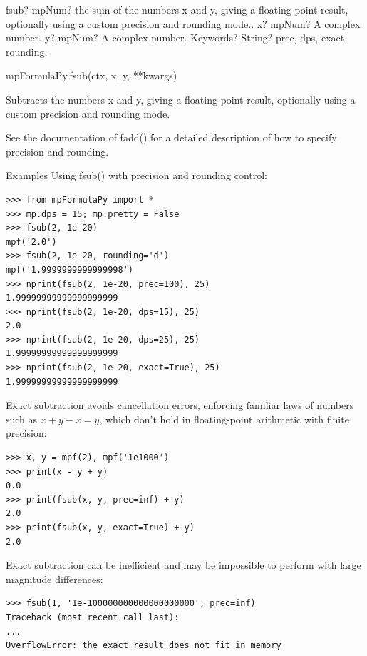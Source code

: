 \vspace{0.3cm}
\begin{mpFunctionsExtract}
	\mpFunctionThree
	{fsub? mpNum? the sum of the numbers x and y, giving a floating-point result, optionally using a custom precision and rounding mode..}
	{x? mpNum? A complex number.}
	{y? mpNum? A complex number.}
	{Keywords? String? prec, dps, exact, rounding.}	
\end{mpFunctionsExtract}

\vspace{0.3cm}
mpFormulaPy.fsub(ctx, x, y, **kwargs)

\vpara
Subtracts the numbers x and y, giving a floating-point result, optionally using a custom precision and rounding mode.

\vpara
See the documentation of fadd() for a detailed description of how to specify precision and rounding.

\vpara
Examples
Using fsub() with precision and rounding control:

\begin{lstlisting}
>>> from mpFormulaPy import *
>>> mp.dps = 15; mp.pretty = False
>>> fsub(2, 1e-20)
mpf('2.0')
>>> fsub(2, 1e-20, rounding='d')
mpf('1.9999999999999998')
>>> nprint(fsub(2, 1e-20, prec=100), 25)
1.99999999999999999999
>>> nprint(fsub(2, 1e-20, dps=15), 25)
2.0
>>> nprint(fsub(2, 1e-20, dps=25), 25)
1.99999999999999999999
>>> nprint(fsub(2, 1e-20, exact=True), 25)
1.99999999999999999999
\end{lstlisting}


Exact subtraction avoids cancellation errors, enforcing familiar laws of numbers such as $x+y-x=y$, which don’t hold in floating-point arithmetic with finite precision:

\begin{lstlisting}
>>> x, y = mpf(2), mpf('1e1000')
>>> print(x - y + y)
0.0
>>> print(fsub(x, y, prec=inf) + y)
2.0
>>> print(fsub(x, y, exact=True) + y)
2.0
\end{lstlisting}


Exact subtraction can be inefficient and may be impossible to perform with large magnitude differences:

\begin{lstlisting}
>>> fsub(1, '1e-100000000000000000000', prec=inf)
Traceback (most recent call last):
...
OverflowError: the exact result does not fit in memory
\end{lstlisting}


